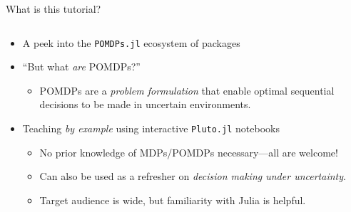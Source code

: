 \begin{frame}[fragile]{What is this tutorial?}
\begin{columns}[T,onlytextwidth]
\begin{column}{0.65\linewidth}
{\begin{itemize}
            \item A peek into the \texttt{POMDPs.jl} ecosystem of \textbf{\large{\julialogo}} packages
            \item ``But what \textit{are} POMDPs?''
            {\footnotesize
            \begin{itemize}
                \item POMDPs are a \textit{problem formulation} that enable optimal\footnotemark{} sequential decisions to be made in uncertain environments.
            \end{itemize}}
            \item Teaching \textit{by example} using interactive \texttt{Pluto.jl} notebooks
            {\footnotesize
            \begin{itemize}
                \item No prior knowledge of MDPs/POMDPs necessary---all are welcome!
                \item Can also be used as a refresher on \textit{decision making under uncertainty}.
                \item Target audience is wide, but familiarity with Julia is helpful.
            \end{itemize}}
        \end{itemize}
        }
    \end{column}
\end{columns}
\end{frame}


